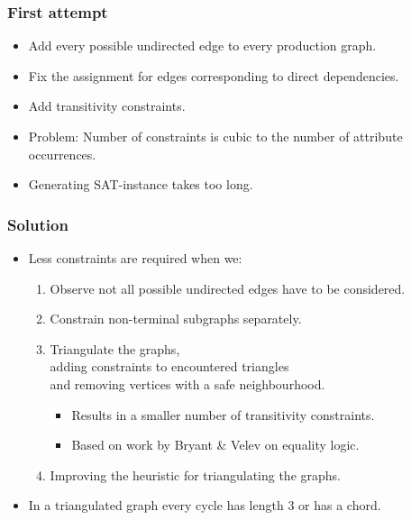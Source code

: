 \documentclass{beamer}
\begin{document}
\begin{frame}
\begin{itemize}
\begin{figure}
        \end{figure}
    \end{itemize}
\end{frame}

\begin{frame}
    \frametitle{First attempt}
    \begin{itemize}
        \item Add every possible undirected edge to every production graph.
        \item Fix the assignment for edges corresponding to direct dependencies.
        \item Add transitivity constraints.
        \item Problem: Number of constraints is cubic to the number of attribute occurrences.
        \item Generating SAT-instance takes too long.
    \end{itemize}
\end{frame}

\begin{frame}
    \frametitle{Solution}
    \begin{itemize}
        \item Less constraints are required when we:
        \begin{enumerate}
            \item Observe not all possible undirected edges have to be considered.
            \item Constrain non-terminal subgraphs separately.
            \item Triangulate the graphs,\\
                    adding constraints to encountered triangles\\
                    and removing vertices with a safe neighbourhood.
            \begin{itemize}
                \item Results in a smaller number of transitivity constraints.
                \item Based on work by Bryant \& Velev on equality logic.
            \end{itemize}
            \item Improving the heuristic for triangulating the graphs.
        \end{enumerate}
        \item In a triangulated graph every cycle has length 3 or has a chord.
    \end{itemize}
\end{frame}
\end{document}
